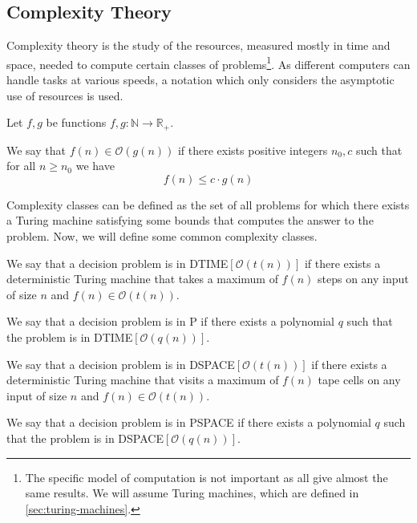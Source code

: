 \subsection{Complexity Theory}\label{subsec:complexity-theory}

Complexity theory is the study of the resources, measured mostly in time and space, needed to compute certain classes of problems\footnote{The specific model of computation is not important as all give almost the same results. We will assume Turing machines, which are defined in \cref{sec:turing-machines}.}.
As different computers can handle tasks at various speeds, a notation which only considers the asymptotic use of resources is used.

\begin{define}
    Let $f, g$ be functions $f, g: \mathbb{N} \to \mathbb{R}_+$.

    We say that $f(n) \in \mathcal{O}(g(n))$ if there exists positive integers $n_0, c$ such that for all $n \geq n_0$ we have \[f(n) \leq c\cdot g(n)\]
\end{define}

Complexity classes can be defined as the set of all problems for which there exists a Turing machine satisfying some bounds that computes the answer to the problem.
Now, we will define some common complexity classes.

\begin{define}
[{DTIME$[\mathcal{O}(t(n))]$}] %
    We say that a decision problem is in DTIME$[\mathcal{O}(t(n))]$ if there exists a deterministic Turing machine that takes a maximum of $f(n)$ steps on any input of size $n$ and $f(n) \in \mathcal{O}(t(n))$.
\end{define}

\begin{define}[P]
    We say that a decision problem is in P if there exists a polynomial $q$ such that the problem is in DTIME$[\mathcal{O}(q(n))]$.
\end{define}

\begin{define}
[{DSPACE$[\mathcal{O}(t(n))]$}]
    We say that a decision problem is in DSPACE$[\mathcal{O}(t(n))]$ if there exists a deterministic Turing machine that visits a maximum of $f(n)$ tape cells on any input of size $n$ and $f(n) \in \mathcal{O}(t(n))$.
\end{define}

\begin{define}[PSPACE]
    We say that a decision problem is in PSPACE if there exists a polynomial $q$ such that the problem is in DSPACE$[\mathcal{O}(q(n))]$.
\end{define}

